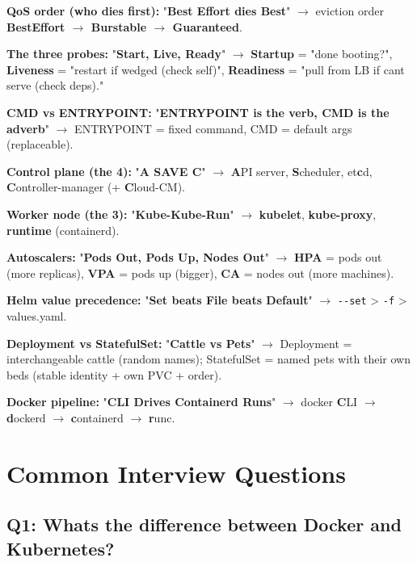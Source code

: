 \documentclass[11pt]{article}
\begin{document}
\textbf{QoS order (who dies first):} "\textbf{Best Effort dies Best}" \(\rightarrow\) eviction order \textbf{BestEffort \(\rightarrow\) Burstable \(\rightarrow\) Guaranteed}.

\textbf{The three probes:} "\textbf{Start, Live, Ready}" \(\rightarrow\) \textbf{Startup} = "done booting?", \textbf{Liveness} = "restart if wedged (check self)", \textbf{Readiness} = "pull from LB if can\textquotesingle t serve (check deps)."

\textbf{CMD vs ENTRYPOINT:} "\textbf{ENTRYPOINT is the verb, CMD is the adverb}" \(\rightarrow\) ENTRYPOINT = fixed command, CMD = default args (replaceable).

\textbf{Control plane (the 4):} "\textbf{A SAVE C}" \(\rightarrow\) \textbf{A}PI server, \textbf{S}cheduler, et\textbf{c}d, \textbf{C}ontroller-manager (+ \textbf{C}loud-CM).

\textbf{Worker node (the 3):} "\textbf{Kube-Kube-Run}" \(\rightarrow\) \textbf{kubelet}, \textbf{kube-proxy}, \textbf{runtime} (containerd).

\textbf{Autoscalers:} "\textbf{Pods Out, Pods Up, Nodes Out}" \(\rightarrow\) \textbf{HPA} = pods out (more replicas), \textbf{VPA} = pods up (bigger), \textbf{CA} = nodes out (more machines).

\textbf{Helm value precedence:} "\textbf{Set beats File beats Default}" \(\rightarrow\) \texttt{-\/-set} \textgreater{} \texttt{-f} \textgreater{} values.yaml.

\textbf{Deployment vs StatefulSet:} "\textbf{Cattle vs Pets}" \(\rightarrow\) Deployment = interchangeable cattle (random names); StatefulSet = named pets with their own beds (stable identity + own PVC + order).

\textbf{Docker pipeline:} "\textbf{CLI Drives Containerd Runs}" \(\rightarrow\) docker \textbf{C}LI \(\rightarrow\) \textbf{d}ockerd \(\rightarrow\) \textbf{c}ontainerd \(\rightarrow\) \textbf{r}unc.

\section{Common Interview Questions}\label{common-interview-questions}

\subsection{Q1: What\textquotesingle s the difference between Docker and Kubernetes?}\label{q1-whats-the-difference-between-docker-and-kubernetes}
\end{document}
